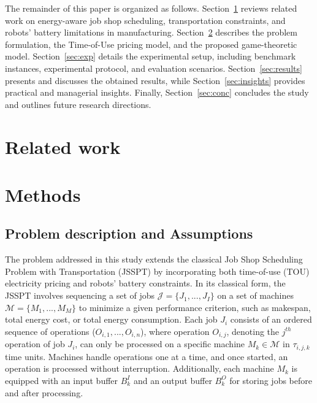 \documentclass[preprint, 3p, review, 12pt]{elsarticle}
\begin{document}
The remainder of this paper is organized as follows. Section~\ref{sec:rwork} reviews related work on energy-aware job shop scheduling, transportation constraints, and robots' battery limitations in manufacturing. Section~\ref{sec:methods} describes the problem formulation, the Time-of-Use pricing model, and the proposed game-theoretic model. Section~\ref{sec:exp} details the experimental setup, including benchmark instances, experimental protocol, and evaluation scenarios. Section~\ref{sec:results} presents and discusses the obtained results, while Section~\ref{sec:insights} provides practical and managerial insights. Finally, Section~\ref{sec:conc} concludes the study and outlines future research directions.

\section{Related work}
\label{sec:rwork}


\section{Methods}
\label{sec:methods}

\subsection{Problem description and Assumptions}
The problem addressed in this study extends the classical Job Shop Scheduling Problem with Transportation (JSSPT) by incorporating both time-of-use (TOU) electricity pricing and robots’ battery constraints. In its classical form, the JSSPT involves sequencing a set of jobs \(\mathcal{J} = \{J_1, ..., J_I\}\) on a set of machines \(\mathcal{M} = \{M_1, ..., M_M\}\) to minimize a given performance criterion, such as makespan, total energy cost, or total energy consumption. Each job $J_i$ consists of an ordered sequence of operations ($O_{i,1}, ..., O_{i,n}$), where operation $O_{i,j}$, denoting the $j^{th}$ operation of job $J_i$, can only be processed on a specific machine $M_k \in \mathcal{M}$ in $\tau_{i,j,k}$ time units. Machines handle operations one at a time, and once started, an operation is processed without interruption. Additionally, each machine $M_k$ is equipped with an input buffer $B^I_k$ and an output buffer $B^O_k$ for storing jobs before and after processing.
\end{document}
